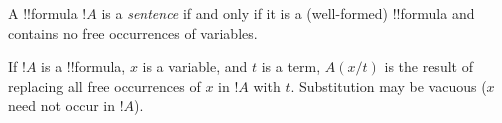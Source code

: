 \documentclass[open-logic-section]{subfiles}
\begin{document}
\begin{defn}[Sentence]
A !!{formula} $!A$ is a \emph{sentence} if and only if it is a
(well-formed) !!{formula} and contains no free occurrences of variables.
\end{defn}


\begin{defn}
If $!A$ is a !!{formula}, $x$ is a variable, and $t$ is a term, $A(x/t)$
is the result of replacing all free occurrences of $x$ in $!A$ with
$t$. Substitution may be vacuous ($x$ need not occur in $!A$).
\end{defn}
\end{document}
